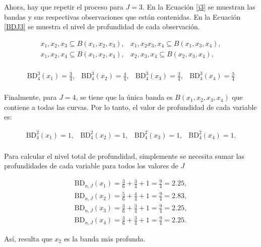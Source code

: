 \begin{ejemplo}
Ahora, hay que repetir el proceso para $J = 3$. En la Ecuación \eqref{j3} se muestran las bandas y sus respectivas observaciones que están contenidas. En la Ecuación \eqref{BDJ3} se muestra el nivel de profundidad de cada observación.

\begin{equation}\label{j3}
    \begin{matrix}
        x_1, x_2, x_3 \subseteq B(x_1, x_2, x_3), & x_1, x_2 x_3, x_4 \subseteq B(x_1, x_3, x_4), \\
        x_1, x_2, x_4 \subseteq B(x_1, x_2, x_4), & x_2, x_3, x_4 \subseteq B(x_2, x_3, x_4), \\
    \end{matrix}
\end{equation}

\begin{equation}\label{BDJ3}
    \begin{matrix}
        \mathrm{BD}^{3}_4(x_1) = \frac{3}{4}, & \mathrm{BD}^{3}_4(x_2) = \frac{4}{4},  & \mathrm{BD}^{3}_4(x_3) = \frac{3}{4},  & \mathrm{BD}^{3}_4(x_4) = \frac{3}{4} \\
    \end{matrix} 
\end{equation}

Finalmente, para $J = 4$, se tiene que la única banda es $B(x_1, x_2, x_3, x_4)$ que contiene a todas las curvas. Por lo tanto, el valor de profundidad de cada variable es:

\begin{equation}
    \begin{matrix}
            \mathrm{BD}^{2}_4(x_1) = 1, & \mathrm{BD}^{2}_4 (x_2) = 1,  & \mathrm{BD}^{2}_4(x_3) = 1,  & \mathrm{BD}^{2}_4(x_4) = 1. \\
        \end{matrix}    
\end{equation}

Para calcular el nivel total de profundidad, simplemente se necesita sumar las profundidades de cada variable para todos los valores de $J$

\begin{equation}
    \begin{matrix}
\mathrm{BD}_{n, J}(x_1) = \frac{3}{6} + \frac{3}{4} + 1 = \frac{9}{4} = 2.25, \\
\mathrm{BD}_{n, J}(x_2) = \frac{5}{6} + \frac{4}{4} + 1 = \frac{9}{4} = 2.83, \\
\mathrm{BD}_{n, J}(x_3) = \frac{3}{6} + \frac{3}{4} + 1 = \frac{9}{4} = 2.25, \\
\mathrm{BD}_{n, J}(x_4) = \frac{3}{6} + \frac{3}{4} + 1 = \frac{9}{4} = 2.25.
\end{matrix}
\end{equation}

Así, resulta que $x_2$ es la banda más profunda.

\end{ejemplo}

